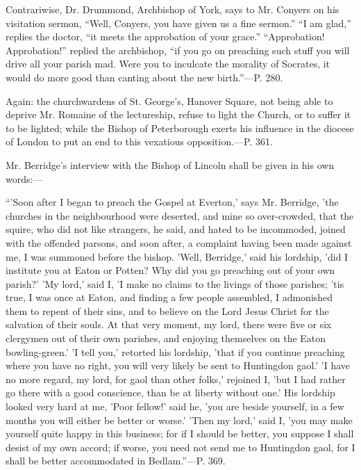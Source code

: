 Contrariwise, Dr. Drummond, Archbishop of York,
says to Mr. Conyers on his visitation sermon, ``Well, Conyers, you have
given us a fine sermon.'' ``I am glad,'' replies the doctor, ``it meets
the approbation of your grace.'' ``Approbation! Approbation!'' replied
the archbishop, ``if you go on preaching such stuff you will drive all
your parish mad. Were you to inculcate the morality of Socrates, it
would do more good than canting about the new birth.''—P. 280.

Again: the churchwardens of St. George's, Hanover
Square, not being able to deprive Mr. Romaine of the lectureship,
refuse to light the Church, or to suffer it to be lighted; while the
Bishop of Peterborough exerts his influence in the diocese of
London to put an end to this vexatious opposition.—P. 361.

Mr. Berridge's interview with the Bishop of
Lincoln shall be given in his own words:—

``'Soon
after I began to preach the Gospel at Everton,' says Mr. Berridge,
'the churches in the neighbourhood were deserted, and mine so
over-crowded, that the squire, who did not like strangers, he said,
and hated to be incommoded, joined with the offended parsons, and soon
after, a complaint having been made against me, I was summoned before
the bishop. 'Well, Berridge,' said his lordship, 'did I institute you
at Eaton or Potten? Why did you go preaching out of your own parish?'
'My lord,' said I, 'I make no claims to the livings of those parishes;
'tis true, I was once at Eaton, and finding a few people assembled, I
admonished them to repent of their sins, and to believe on the Lord
Jesus Christ for the salvation of their souls. At that very moment, my
lord, there were five or six clergymen out of their own parishes, and
enjoying themselves on the Eaton bowling-green.' 'I tell you,'
retorted his lordship, 'that if you continue preaching where you have
no right, you will very likely be sent to Huntingdon gaol.' 'I have no
more regard, my lord, for gaol than other folks,' rejoined I, 'but I
had rather go there with a good conscience, than be at liberty without
one.' His lordship looked very hard at me, 'Poor fellow!' said he,
'you are beside yourself, in a few months you will either be better or
worse.' 'Then my lord,' said I, 'you may make yourself quite happy in
this business; for if I should be better, you suppose I shall desist
of my own accord; if worse, you need not send me to Huntingdon gaol,
for I shall be better accommodated in Bedlam.''—P. 369.

